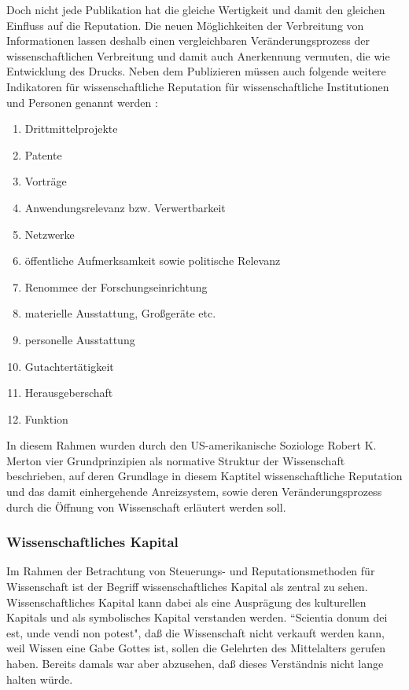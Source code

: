 Doch nicht jede Publikation hat die gleiche Wertigkeit\cite{suchen} und damit den gleichen Einfluss auf die Reputation. Die neuen Möglichkeiten der Verbreitung von Informationen lassen deshalb einen vergleichbaren Veränderungsprozess der wissenschaftlichen Verbreitung und damit auch Anerkennung vermuten, die wie Entwicklung des Drucks.\cite{suchen} Neben dem Publizieren müssen auch folgende weitere Indikatoren für wissenschaftliche Reputation für wissenschaftliche Institutionen und Personen genannt werden :
\begin{enumerate}
\item Drittmittelprojekte
\item Patente
\item Vorträge
\item Anwendungsrelevanz bzw. Verwertbarkeit
\item Netzwerke
\item öffentliche Aufmerksamkeit sowie politische Relevanz 
\item Renommee der Forschungseinrichtung
\item materielle Ausstattung, Großgeräte etc.
\item personelle Ausstattung
\item Gutachtertätigkeit
\item Herausgeberschaft
\item Funktion
\end{enumerate}
In diesem Rahmen wurden durch den US-amerikanische Soziologe Robert K. Merton vier Grundprinzipien als normative Struktur der Wissenschaft beschrieben\cite{Merton_1985}, auf deren Grundlage in diesem Kaptitel wissenschaftliche Reputation und das damit einhergehende Anreizsystem, sowie deren Veränderungsprozess durch die Öffnung von Wissenschaft erläutert werden soll. 

\subsubsection{Wissenschaftliches Kapital}
Im Rahmen der Betrachtung von Steuerungs- und Reputationsmethoden für Wissenschaft ist der Begriff wissenschaftliches Kapital als zentral zu sehen\cite{suchen}. Wissenschaftliches Kapital kann dabei als eine Ausprägung des kulturellen Kapitals und als symbolisches Kapital\cite{suchen} verstanden werden. “Scientia donum dei est, unde vendi non potest", daß die Wissenschaft nicht verkauft werden kann, weil Wissen eine Gabe Gottes ist, sollen die Gelehrten des Mittelalters gerufen haben\cite{suchen}. Bereits damals war aber abzusehen, daß dieses Verständnis nicht lange halten würde.

